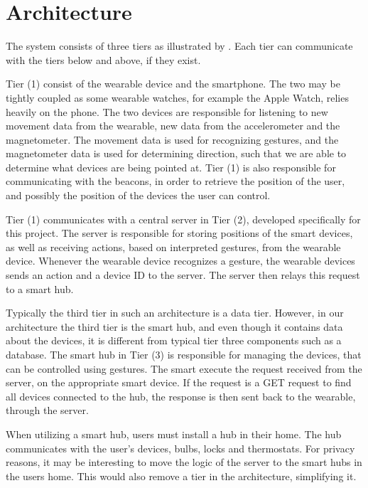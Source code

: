 \section{Architecture}\label{sec:architecture}
The system consists of three tiers as illustrated by . 
Each tier can communicate with the tiers below and above, if they exist.

Tier (1) consist of the wearable device and the smartphone.
The two may be tightly coupled as some wearable watches, 
for example the Apple Watch, relies heavily on the phone. 
The two devices are responsible for listening to new movement data from the wearable, 
\eg new data from the accelerometer and the magnetometer.
The movement data is used for recognizing gestures, 
and the magnetometer data is used for determining direction, 
such that we are able to determine what devices are being pointed at. 
Tier (1) is also responsible for communicating with the beacons, 
in order to retrieve the position of the user, 
and possibly the position of the devices the user can control. 

Tier (1) communicates with a central server in Tier (2), 
developed specifically for this project. 
The server is responsible for storing positions of the smart devices, 
as well as receiving actions, based on interpreted gestures, from the wearable device.
Whenever the wearable device recognizes a gesture, 
the wearable devices sends an action and a device ID to the server.
The server then relays this request to a smart hub. 

Typically the third tier in such an architecture is a data tier. 
However, in our architecture the third tier is the smart hub, 
and even though it contains data about the devices, 
it is different from typical tier three components such as a database. 
The smart hub in Tier (3) is responsible for managing the devices, 
that can be controlled using gestures. 
The smart execute the request received from the server, 
on the appropriate smart device. 
If the request is a GET request to find all devices connected to the hub, 
the response is then sent back to the wearable, through the server. 

When utilizing a smart hub, users must install a hub in their home. 
The hub communicates with the user's devices, \eg bulbs, locks and thermostats. 
For privacy reasons, it may be interesting to move the logic of the server to the smart hubs in the users home. 
This would also remove a tier in the architecture, simplifying it.


